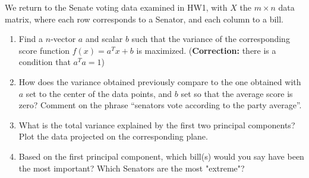 \documentclass[11pt]{article}
\begin{document}
We return to the Senate voting data examined in HW1, with $X$ the $m \times n$ data matrix, where each row corresponds to a Senator, and each column to a bill.
\begin{enumerate}
    \item Find a $n$-vector $a$ and scalar $b$ such that the variance of the corresponding score function $f(x) = a^Tx+b$ is maximized. (\textbf{Correction:} there is a condition that $a^T a = 1$)
    \item How does the variance obtained previously compare to the one obtained with $a$ set to the center of the data points, and $b$ set so that the average score is zero? Comment on the phrase ``senators vote according to the party average''.
    \item What is the total variance explained by the first two principal components? Plot the data projected on the corresponding plane.
    \item Based on the first principal component, which bill(s) would you say have been the most important? Which Senators are the most "extreme"?
\end{enumerate}
\end{document}
